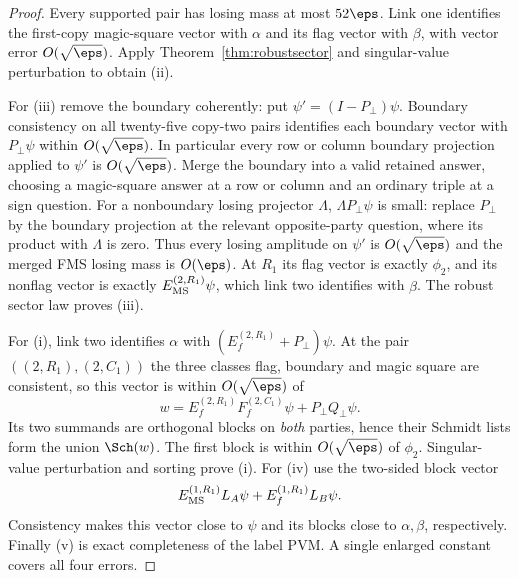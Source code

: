 \begin{proof}
Every supported pair has losing mass at most $52\eps$.
Link one identifies the first-copy magic-square vector with $\alpha$
and its flag vector with $\beta$, with vector error $O(\sqrt\eps)$.
Apply Theorem~\ref{thm:robustsector} and singular-value perturbation
to obtain (ii).

For (iii) remove the boundary coherently: put
$\psi'=(I-P_\bot)\psi$. Boundary consistency on all twenty-five
copy-two pairs identifies each boundary vector with $P_\bot\psi$
within $O(\sqrt\eps)$. In particular every row or column boundary
projection applied to $\psi'$ is $O(\sqrt\eps)$.
Merge the boundary into a valid retained answer, choosing a magic-square
answer at a row or column and an ordinary triple at a sign question.
For a nonboundary losing projector $\Lambda$,
$\Lambda P_\bot\psi$ is small: replace $P_\bot$ by the boundary
projection at the relevant opposite-party question, where its product
with $\Lambda$ is zero. Thus every losing amplitude on $\psi'$ is
$O(\sqrt\eps)$ and the merged FMS losing mass is $O(\eps)$.
At $R_1$ its flag vector is exactly $\phi_2$, and its nonflag vector is
exactly $E_{\rm MS}^{(2,R_1)}\psi$, which link two identifies with
$\beta$. The robust sector law proves (iii).

For (i), link two identifies $\alpha$ with
$(E_f^{(2,R_1)}+P_\bot)\psi$. At the pair $((2,R_1),(2,C_1))$ the
three classes flag, boundary and magic square are consistent, so this
vector is within $O(\sqrt\eps)$ of
\[
w=E_f^{(2,R_1)}F_f^{(2,C_1)}\psi+P_\bot Q_\bot\psi.
\]
Its two summands are orthogonal blocks on \emph{both} parties, hence
their Schmidt lists form the union $\Sch(w)$. The first block is
within $O(\sqrt\eps)$ of $\phi_2$. Singular-value perturbation and
sorting prove (i). For (iv) use the two-sided block vector
\[
E_{\rm MS}^{(1,R_1)}L_A\psi+E_f^{(1,R_1)}L_B\psi.
\]
Consistency makes this vector close to $\psi$ and its blocks close to
$\alpha,\beta$, respectively. Finally (v) is exact completeness of
the label PVM. A single enlarged constant covers all four errors.
\end{proof}

